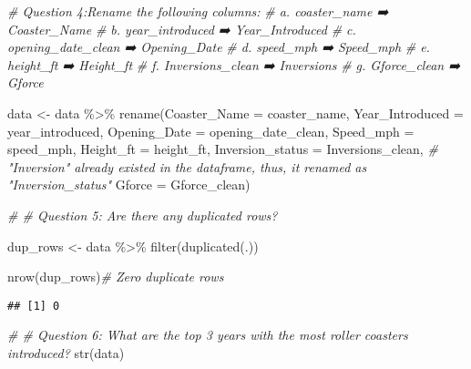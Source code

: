 \documentclass[
]{article}
\newenvironment{Shaded}{\begin{snugshade}}{\end{snugshade}}
\newcommand{\AttributeTok}[1]{\textcolor[rgb]{0.77,0.63,0.00}{#1}}
\newcommand{\CommentTok}[1]{\textcolor[rgb]{0.56,0.35,0.01}{\textit{#1}}}
\newcommand{\FunctionTok}[1]{\textcolor[rgb]{0.00,0.00,0.00}{#1}}
\newcommand{\NormalTok}[1]{#1}
\newcommand{\OtherTok}[1]{\textcolor[rgb]{0.56,0.35,0.01}{#1}}
\newcommand{\SpecialCharTok}[1]{\textcolor[rgb]{0.00,0.00,0.00}{#1}}
\begin{document}
\begin{Shaded}
\begin{Highlighting}[]
\CommentTok{\# Question 4:Rename the following columns:}
\CommentTok{\# a. coaster\_name ➡️ Coaster\_Name}
\CommentTok{\# b. year\_introduced ➡️ Year\_Introduced}
\CommentTok{\# c. opening\_date\_clean ➡️ Opening\_Date}
\CommentTok{\# d. speed\_mph ➡️ Speed\_mph}
\CommentTok{\# e. height\_ft ➡️ Height\_ft}
\CommentTok{\# f. Inversions\_clean ➡️ Inversions}
\CommentTok{\# g. Gforce\_clean ➡️ Gforce}

\NormalTok{data }\OtherTok{\textless{}{-}}\NormalTok{ data }\SpecialCharTok{\%\textgreater{}\%} 
  \FunctionTok{rename}\NormalTok{(}\AttributeTok{Coaster\_Name =}\NormalTok{ coaster\_name, }
         \AttributeTok{Year\_Introduced =}\NormalTok{ year\_introduced, }
         \AttributeTok{Opening\_Date =}\NormalTok{ opening\_date\_clean, }
         \AttributeTok{Speed\_mph =}\NormalTok{ speed\_mph, }
         \AttributeTok{Height\_ft =}\NormalTok{ height\_ft, }
         \AttributeTok{Inversion\_status =}\NormalTok{ Inversions\_clean, }\CommentTok{\# "Inversion" already existed in the dataframe, thus, it renamed as "Inversion\_status"}
         \AttributeTok{Gforce =}\NormalTok{ Gforce\_clean)}
\end{Highlighting}
\end{Shaded}

\begin{Shaded}
\begin{Highlighting}[]
\CommentTok{\# \# Question 5: Are there any duplicated rows?}

\NormalTok{dup\_rows }\OtherTok{\textless{}{-}}\NormalTok{ data }\SpecialCharTok{\%\textgreater{}\%} 
  \FunctionTok{filter}\NormalTok{(}\FunctionTok{duplicated}\NormalTok{(.))}

\FunctionTok{nrow}\NormalTok{(dup\_rows)}\CommentTok{\# Zero duplicate rows }
\end{Highlighting}
\end{Shaded}

\begin{verbatim}
## [1] 0
\end{verbatim}

\begin{Shaded}
\begin{Highlighting}[]
\CommentTok{\# \# Question 6: What are the top 3 years with the most roller coasters introduced?}
\FunctionTok{str}\NormalTok{(data)}
\end{Highlighting}
\end{Shaded}
\end{document}
